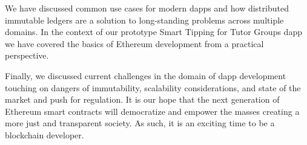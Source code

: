 We have discussed common use cases for modern \ac{dapp}s and how distributed immutable ledgers
are a solution to long-standing problems across multiple domains. In the context of our prototype
Smart Tipping for Tutor Groups \ac{dapp} we have covered the basics of Ethereum development from
a practical perspective.

Finally, we discussed current challenges in the domain of \ac{dapp} development touching on dangers
of immutability, scalability considerations, and state of the market and push for regulation. It is our hope
that the next generation of Ethereum smart contracts will democratize and empower the masses creating
a more just and transparent society. As such, it is an exciting time to be a blockchain developer.
